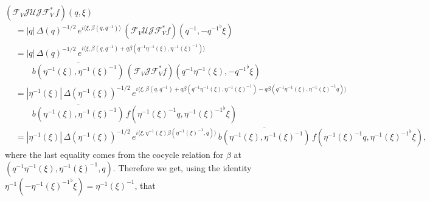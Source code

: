 \documentclass[a4paper,11pt,reqno]{amsart}
\numberwithin{equation}{section}
\theoremstyle{remark}
\theoremstyle{definition}
\newcommand{\CJ}{\mathcal J}
\newcommand{\CU}{\mathcal U}
\newcommand{\CF}{\mathcal F}
\begin{document}
\medskip
$\displaystyle (\CF_V \CJ\CU\CJ\CF_V^*\,f)(q,\xi)$
\begin{align*}
&=|q|\,\Delta(q)^{-1/2}\,e^{i\langle \xi,\beta(q,q^{-1})\rangle}\,(\CF_V \CU\CJ\CF_V^*f)(q^{-1},-{q^{-1}}^\flat\xi)\\
&=|q|\,\Delta(q)^{-1/2}\,e^{i\langle \xi,\beta(q,q^{-1})+q\beta(q^{-1}\eta^{-1}(\xi),\eta^{-1}(\xi)^{-1})\rangle}\\
&\qquad \overline {b(\eta^{-1}(\xi),\eta^{-1}(\xi)^{-1})}\,(\CF_V \CJ\CF_V^*f)(q^{-1}\eta^{-1}(\xi),-{q^{-1}}^\flat\xi)\\
&=|\eta^{-1}(\xi)|\,\Delta(\eta^{-1}(\xi))^{-1/2}\,e^{i\langle \xi,\beta(q,q^{-1})+q\beta(q^{-1}\eta^{-1}(\xi),\eta^{-1}(\xi)^{-1})
-q\beta(q^{-1}\eta^{-1}(\xi),\eta^{-1}(\xi)^{-1}q)\rangle}\\
&\qquad \overline {b(\eta^{-1}(\xi),\eta^{-1}(\xi)^{-1})}\,f(\eta^{-1}(\xi)^{-1}q,{\eta^{-1}(\xi)^{-1}}^\flat\xi)\\
&=|\eta^{-1}(\xi)|\,\Delta(\eta^{-1}(\xi))^{-1/2}\,e^{i\langle \xi,\eta^{-1}(\xi)\beta(\eta^{-1}(\xi)^{-1},q)\rangle}\,\overline {b(\eta^{-1}(\xi),\eta^{-1}(\xi)^{-1})}\, f(\eta^{-1}(\xi)^{-1}q,{\eta^{-1}(\xi)^{-1}}^\flat\xi),
\end{align*}
where the last equality comes from the cocycle relation for $\beta$ at $(q^{-1}\eta^{-1}(\xi),\eta^{-1}(\xi)^{-1},q)$.
Therefore we get, using the identity $\eta^{-1}(-{\eta^{-1}(\xi)^{-1}}^\flat\xi)=\eta^{-1}(\xi)^{-1}$, that
\end{document}
